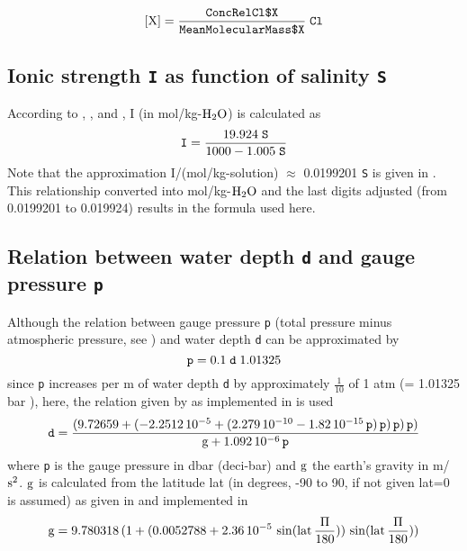 \documentclass[a4paper]{article}
\begin{document}
\begin{equation}
\rm [X] = \frac{\mbox{\texttt{ConcRelCl\textdollar$ $X}}}{\mbox{\texttt{MeanMolecularMass\textdollar$ $X}}}\;\texttt{Cl}
\end{equation}

\subsection{Ionic strength \texttt{I} as function of salinity \texttt{S}}
According to \citet[chapter 5, p. 13, 15]{DOE1994},  \citet[ p.12]{Zeebe2001}, and \citet[ p.257]{Roy1993b}, I (in mol/kg-$\rm H_2O$) is calculated as
\begin{equation}
\rm \mbox{\texttt{I}} = \frac{19.924\;\mbox{\texttt{S}}}{1000-1.005\;\mbox{\texttt{S}}}
\end{equation}
Note that the approximation I/(mol/kg-solution) $\approx$ 0.0199201 \texttt{S} is given in \citet[  p. 428.]{Millero1982}.
This relationship converted into mol/kg-$\rm H_2O$ and the last digits adjusted (from 0.0199201 to 0.019924) results in the formula used here.\\

\subsection{Relation between water depth \texttt{d} and gauge pressure \texttt{p}}
Although the relation between gauge pressure \texttt{p} (total pressure minus atmospheric pressure, see \cite{Feistel2008})  and water depth \texttt{d} can be approximated by 
\begin{equation}
 \rm \mbox{\texttt{p}} = 0.1\;\mbox{\texttt{d}}\;1.01325
\end{equation}
since \texttt{p} increases per m of water depth \texttt{d} by approximately $\frac{1}{10}$ of 1 atm (= 1.01325 bar \citet[chap. 5, p. 3]{Dickson2007}),
here, the relation given by \cite{Fofonoff1983} as implemented in \cite{marelac} is used
\begin{equation}
\rm \mbox{\texttt{d}} = \frac{(9.72659 + (-2.2512\,10^{-5} + (2.279\,10^{-10} - 1.82\,10^{-15} \, \mbox{\texttt{p}}) \, \mbox{\texttt{p}})\, \mbox{\texttt{p}})\, \mbox{\texttt{p}})}{g + 1.092\,10^{-6} \, \mbox{\texttt{p}}}
\end{equation}
where \mbox{\texttt{p}} is the gauge pressure in dbar (deci-bar) and $\rm g$ the earth's gravity in m/$\rm s^2$. $\rm g$ is calculated from the latitude lat (in degrees, -90 to 90, if not given lat=0 is assumed) as given in \cite{Fofonoff1983}
and implemented in \cite{marelac}
\begin{equation}
\rm g = 9.780318\, (1+ ( 0.0052788 + 2.36\,10^{-5}\,\sin(lat\,\frac{\Pi}{180}))\,\sin(lat\,\frac{\Pi}{180}))
\end{equation}
\end{document}
